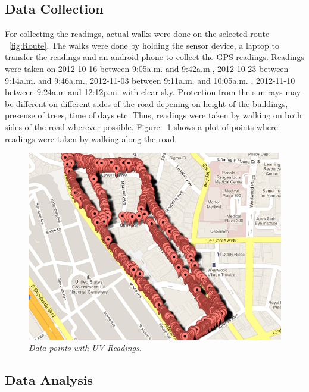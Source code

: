 \documentclass[10pt]{sigplan-proc-varsize}
\begin{document}
\subsection{Data Collection}
For collecting the readings, actual walks were done on the selected route ~\ref{fig:Route}. The walks were done by holding the sensor device, a laptop to transfer the readings and an android phone to collect the GPS readings. Readings were taken on 2012-10-16 between 9:05a.m. and 9:42a.m., 2012-10-23 between 9:14a.m. and 9:46a.m., 2012-11-03 between 9:11a.m. and 10:05a.m. , 2012-11-10 between 9:24a.m and 12:12p.m. with clear sky. Protection from the sun rays may be different on different sides of the road depening on height of the buildings, presense of trees, time of days etc. Thus, readings were taken by walking on both sides of the road wherever possible. Figure ~\ref{fig:dataPoints} shows a plot of points where readings were taken by walking along the road.
\begin{figure}
\begin{center}
\includegraphics[scale=0.35]{dataPoints.png}
\caption{\small \sl Data points with UV Readings.\label{fig:dataPoints}}
\end{center}
\end{figure}

\subsection{Data Analysis}
\end{document}
